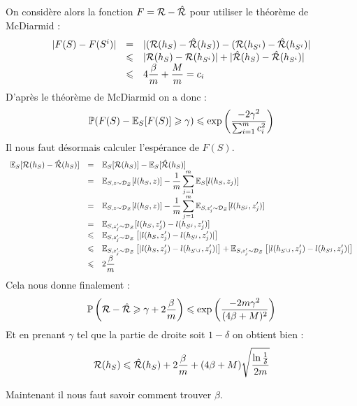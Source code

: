 On considère alors la fonction $F = \mathcal{R} - \hat{\mathcal{R}}$ pour utiliser le théorème de McDiarmid :
$$ \begin{array}{lll}
	| F(S) - F(S^i) |
	& = & | (\mathcal{R}(h_S) - \hat{\mathcal{R}}(h_S)) - (\mathcal{R}(h_{S^i}) - \hat{\mathcal{R}}(h_{S^i}) | \\
	& \leqslant & | \mathcal{R}(h_S) - \mathcal{R}(h_{S^i}) | + | \hat{\mathcal{R}}(h_S) - \hat{\mathcal{R}}(h_{S^i}) | \\
	& \leqslant & 4 \dfrac{\beta}{m} + \dfrac{M}{m} = c_i
\end{array} $$
D'après le théorème de McDiarmid on a donc :
$$ \mathbb{P}(F(S) - \mathbb{E}_S[F(S)] \geqslant \gamma) \leqslant \exp \left( \dfrac{- 2 \gamma^2}{\sum_{i = 1}^m c_i^2} \right) $$
Il nous faut désormais calculer l'espérance de $F(S)$.
$$ \begin{array}{lll}
	\E_S[\trisk(h_S) - \erisk(h_S)]
	& = & \E_S[\trisk(h_S)] - \E_S[\erisk(h_S)] \\
	& = &\displaystyle \E_{S, z \sim \dist}[l(h_S, z)] - \dfrac{1}{m} \sum_{j = 1}^m \E_S[l(h_S, z_j)] \\
	& = & \displaystyle \E_{S, z \sim \dist}[l(h_S, z)] - \dfrac{1}{m} \sum_{j = 1}^m \E_{S, z_j^\prime \sim \dist}[l(h_{S^j}, z_j^\prime)] \\
	& = & \E_{S, z_j^\prime \sim \dist}[l(h_S, z_j^\prime)-l(h_{S^j}, z_j^\prime)] \\ \vspace{1mm}
	& \leqslant & \displaystyle \E_{S, z_j^\prime \sim \dist} \left[ | l(h_S, z_j^\prime)-l(h_{S^j}, z_j^\prime) | \right] \\
	& \leqslant & \displaystyle \E_{S, z_j^\prime \sim \dist} \left[ | l(h_S, z_j^\prime)-l(h_{S^{\setminus j}}, z_j^\prime) | \right] + \E_{S, z_j^\prime \sim \dist} \left[ | l(h_{S^{\setminus j}}, z_j^\prime)-l(h_{S^j}, z_j^\prime) | \right] \\
	& \leqslant & 2 \dfrac{\beta}{m}
\end{array} $$
Cela nous donne finalement :
$$ \mathbb{P} \left( \mathcal{R} - \hat{\mathcal{R}} \geqslant \gamma + 2 \dfrac{\beta}{m} \right) \leqslant \exp \left( \dfrac{- 2 m \gamma^2}{(4 \beta + M)^2} \right) $$
Et en prenant $\gamma$ tel que la partie de droite soit $1 - \delta$ on obtient bien :
$$ \mathcal{R}(h_S) \leqslant \hat{\mathcal{R}}(h_S) + 2 \dfrac{\beta}{m} + (4 \beta + M) \sqrt{\dfrac{\ln \frac{1}{\delta}}{2m}} $$
\findem

Maintenant il nous faut savoir comment trouver $\beta$.


